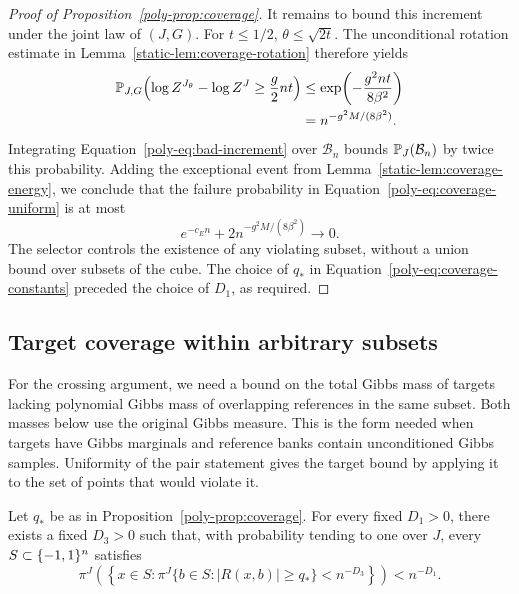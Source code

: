 \begin{proof}[Proof of Proposition~\ref{poly-prop:coverage}]
It remains to bound this increment under the joint law of $(J,G)$.
For $t\le1/2$, $\theta\le\sqrt{2t}$. The unconditional rotation
estimate in Lemma~\ref{static-lem:coverage-rotation} therefore yields
\begin{align*}
 \mathbb P_{J,G}\!\left(
   \log Z^{J_\theta}-\log Z^J\ge\frac g2nt\right)
 &\le\exp\!\left(-\frac{g^2nt}{8\beta^2}\right)\\
 &=n^{-g^2M/(8\beta^2)}.
\end{align*}
Integrating Equation~\eqref{poly-eq:bad-increment} over
$\mathcal B_n$ bounds $\mathbb P_J(\mathcal B_n)$ by twice this probability.
Adding the exceptional event from
Lemma~\ref{static-lem:coverage-energy}, we conclude that the failure
probability in Equation~\eqref{poly-eq:coverage-uniform} is at most
\begin{equation}\label{poly-eq:failure-bound}
 e^{-c_En}+2n^{-g^2M/(8\beta^2)}\longrightarrow0.
\end{equation}
The selector controls the existence of any violating subset, without a
union bound over subsets of the cube. The choice of $q_*$ in
Equation~\eqref{poly-eq:coverage-constants} preceded the choice of
$D_1$, as required.
\end{proof}

\subsection{Target coverage within arbitrary subsets}

For the crossing argument, we need a bound on the total Gibbs mass of
targets lacking polynomial Gibbs mass of overlapping references in the
same subset. Both masses below use the original Gibbs measure. This is
the form needed when targets have Gibbs marginals and reference banks
contain unconditioned Gibbs samples. Uniformity of the pair statement
gives the target bound by applying it to the set of points that would
violate it.

\begin{corollary}
\label{poly-cor:coverage-cells}
Let $q_*$ be as in Proposition~\ref{poly-prop:coverage}.
For every fixed $D_1>0$, there exists a fixed $D_3>0$ such that, with
probability tending to one over $J$, every $S\subset\{-1,1\}^n$ satisfies
\begin{equation}\label{poly-eq:coverage-cells}
 \pi^J\!\left(
  \left\{x\in S:
   \pi^J\{b\in S:|R(x,b)|\ge q_*\}<n^{-D_3}
  \right\}\right)<n^{-D_1}.
\end{equation}
\end{corollary}

